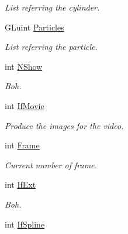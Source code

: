\begin{DoxyCompactItemize}
\begin{DoxyCompactList}\small\item\em List referring the cylinder. \end{DoxyCompactList}\item 
G\+Luint \hyperlink{classForces_a0fd83139e0b18df8d7beb2a83c5ab4d2}{Particles}\hypertarget{classForces_a0fd83139e0b18df8d7beb2a83c5ab4d2}{}\label{classForces_a0fd83139e0b18df8d7beb2a83c5ab4d2}

\begin{DoxyCompactList}\small\item\em List referring the particle. \end{DoxyCompactList}\item 
int \hyperlink{classForces_acebb58ed475923de8833745b19b76f69}{N\+Show}\hypertarget{classForces_acebb58ed475923de8833745b19b76f69}{}\label{classForces_acebb58ed475923de8833745b19b76f69}

\begin{DoxyCompactList}\small\item\em Boh. \end{DoxyCompactList}\item 
int \hyperlink{classForces_a059f36969951363c4c2158e3a0d4f526}{If\+Movie}\hypertarget{classForces_a059f36969951363c4c2158e3a0d4f526}{}\label{classForces_a059f36969951363c4c2158e3a0d4f526}

\begin{DoxyCompactList}\small\item\em Produce the images for the video. \end{DoxyCompactList}\item 
int \hyperlink{classForces_a2aa5389f98e8d550f84ceab92dc6bd86}{Frame}\hypertarget{classForces_a2aa5389f98e8d550f84ceab92dc6bd86}{}\label{classForces_a2aa5389f98e8d550f84ceab92dc6bd86}

\begin{DoxyCompactList}\small\item\em Current number of frame. \end{DoxyCompactList}\item 
int \hyperlink{classForces_ae79e4c8bd829af6de9af7f31efd18936}{If\+Ext}\hypertarget{classForces_ae79e4c8bd829af6de9af7f31efd18936}{}\label{classForces_ae79e4c8bd829af6de9af7f31efd18936}

\begin{DoxyCompactList}\small\item\em Boh. \end{DoxyCompactList}\item 
int \hyperlink{classForces_ae09e8643cb34f698b9d3dc6ffbf6c0e2}{If\+Spline}\hypertarget{classForces_ae09e8643cb34f698b9d3dc6ffbf6c0e2}{}\label{classForces_ae09e8643cb34f698b9d3dc6ffbf6c0e2}


\end{DoxyCompactItemize}
